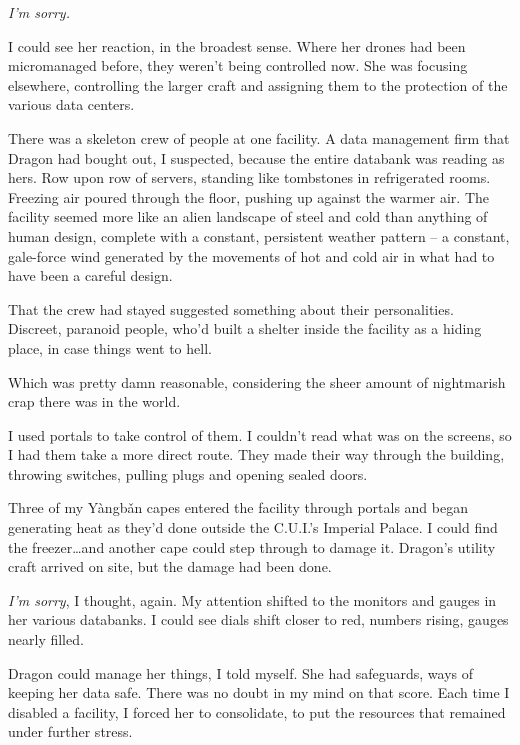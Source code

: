 \emph{I'm sorry.}



I could see her reaction, in the broadest sense.  Where her drones had been micromanaged before, they weren't being controlled now.  She was focusing elsewhere, controlling the larger craft and assigning them to the protection of the various data centers.



There was a skeleton crew of people at one facility.  A data management firm that Dragon had bought out, I suspected, because the entire databank was reading as hers.  Row upon row of servers, standing like tombstones in refrigerated rooms.  Freezing air poured through the floor, pushing up against the warmer air.  The facility seemed more like an alien landscape of steel and cold than anything of human design, complete with a constant, persistent weather pattern – a constant, gale-force wind generated by the movements of hot and cold air in what had to have been a careful design.



That the crew had stayed suggested something about their personalities.  Discreet, paranoid people, who'd built a shelter inside the facility as a hiding place, in case things went to hell.



Which was pretty damn reasonable, considering the sheer amount of nightmarish crap there was in the world.



I used portals to take control of them.  I couldn't read what was on the screens, so I had them take a more direct route.  They made their way through the building, throwing switches, pulling plugs and opening sealed doors.



Three of my Y\`{a}ngb\v{a}n capes entered the facility through portals and began generating heat as they'd done outside the C.U.I.'s Imperial Palace.  I could find the freezer\ldots and another cape could step through to damage it.  Dragon's utility craft arrived on site, but the damage had been done.



\emph{I'm sorry}, I thought, again.  My attention shifted to the monitors and gauges in her various databanks.  I could see dials shift closer to red, numbers rising, gauges nearly filled.



Dragon could manage her things, I told myself.  She had safeguards, ways of keeping her data safe.  There was no doubt in my mind on that score.  Each time I disabled a facility, I forced her to consolidate, to put the resources that remained under further stress.



